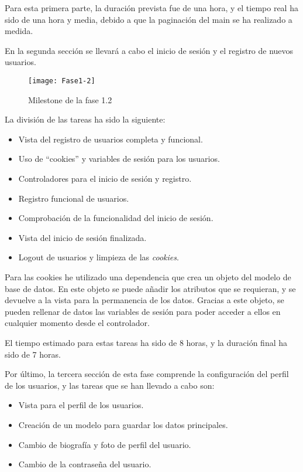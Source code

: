 Para esta primera parte, la duración prevista fue de una hora, y el tiempo real ha sido de una 
hora y media, debido a que la paginación del main se ha realizado a medida.

En la segunda sección se llevará a cabo el inicio de sesión y el registro de nuevos usuarios.
\begin{figure}
    \centering
    \texttt{[image: Fase1-2]}
    \caption{Milestone de la fase 1.2}
\end{figure}
\newpage

La división de las tareas ha sido la siguiente:
\begin{itemize}
\tightlist
\item Vista del registro de usuarios completa y funcional.
\item Uso de ``cookies'' y variables de sesión para los usuarios.
\item Controladores para el inicio de sesión y registro.
\item Registro funcional de usuarios.
\item Comprobación de la funcionalidad del inicio de sesión.
\item Vista del inicio de sesión finalizada.
\item Logout de usuarios y limpieza de las \emph{cookies}.
\end{itemize}

Para las cookies he utilizado una dependencia que crea un objeto del modelo de base de datos.
En este objeto se puede añadir los atributos que se requieran, y se devuelve a la vista
para la permanencia de los datos. Gracias a este objeto, se pueden rellenar de datos las
variables de sesión para poder acceder a ellos en cualquier momento desde el controlador.

El tiempo estimado para estas tareas ha sido de 8 horas, y la duración final ha sido de 7 horas.

Por último, la tercera sección de esta fase comprende la configuración del perfil 
de los usuarios, y las tareas que se han llevado a cabo son:
\begin{itemize}
\tightlist
\item Vista para el perfil de los usuarios.
\item Creación de un modelo para guardar los datos principales.
\item Cambio de biografía y foto de perfil del usuario.
\item Cambio de la contraseña del usuario.
\end{itemize}

